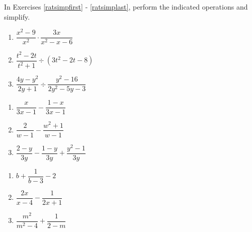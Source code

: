 \label{ExercisesforAppRatExpEqus}

In Exercises \ref{ratsimpfirst} - \ref{ratsimplast}, perform the indicated operations and simplify.

\begin{multicols}{3}
\begin{enumerate}

\item $\dfrac{x^2-9}{x^2} \cdot \dfrac{3x}{x^2-x-6}$\label{ratsimpfirst}
\item $\dfrac{t^2-2t}{t^2+1} \div (3t^2 - 2t - 8)$
\item $\dfrac{4y-y^2}{2y+1} \div \dfrac{y^2-16}{2y^2-5y-3}$

\setcounter{HW}{\value{enumi}}
\end{enumerate}
\end{multicols}

\begin{multicols}{3}
\begin{enumerate}
\setcounter{enumi}{\value{HW}}

\item  $\dfrac{x}{3x-1} - \dfrac{1-x}{3x-1}$
\item  $\dfrac{2}{w-1} - \dfrac{w^2+1}{w-1}$
\item  $\dfrac{2-y}{3y} - \dfrac{1-y}{3y} + \dfrac{y^2-1}{3y}$
 

\setcounter{HW}{\value{enumi}}
\end{enumerate}
\end{multicols}

\begin{multicols}{3}
\begin{enumerate}
\setcounter{enumi}{\value{HW}}

\item  $b+ \dfrac{1}{b-3} - 2$
\item  $\dfrac{2x}{x-4} - \dfrac{1}{2x+1}$
\item  $\dfrac{m^2}{m^2-4} + \dfrac{1}{2-m}$

\setcounter{HW}{\value{enumi}}
\end{enumerate}
\end{multicols}

